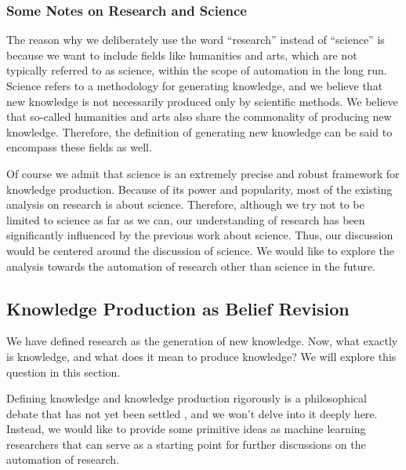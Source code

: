 \subsubsection{Some Notes on Research and Science}

The reason why we deliberately use the word ``research'' instead of ``science'' is because we want to include fields like humanities and arts, which are not typically referred to as science, within the scope of automation in the long run. Science refers to a methodology for generating knowledge, and we believe that new knowledge is not necessarily produced only by scientific methods. We believe that so-called humanities and arts also share the commonality of producing new knowledge. Therefore, the definition of generating new knowledge can be said to encompass these fields as well.

Of course we admit that science is an extremely precise and robust  framework for knowledge production. Because of its power and popularity, most of the existing analysis on research is about science. Therefore, although we try not to be limited to science as far as we can, our understanding of research has been significantly influenced by the previous work about science. Thus, our discussion would be centered around the discussion of science. We would like to explore the analysis towards the automation of research other than science in the future.

\subsection{Knowledge Production as Belief Revision}
We have defined research as the generation of new knowledge. Now, what exactly is knowledge, and what does it mean to produce knowledge? We will explore this question in this section. 

Defining knowledge and knowledge production rigorously is a philosophical debate that has not yet been settled \cite{sep-epistemology}, and we won't delve into it deeply here. Instead, we would like to provide some primitive ideas as machine learning researchers that can serve as a starting point for further discussions on the automation of research.

